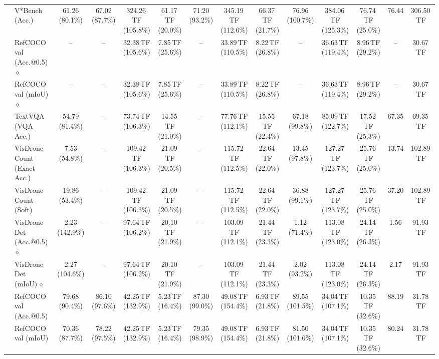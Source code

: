 \begin{table}[t]
\begin{center}
\begin{small}
\begin{sc}
{\begin{tabular}{llcccccccccccc}
& V*Bench (Acc.) & 61.26 (80.1\%) & 67.02 (87.7\%) & 324.26\,TF (105.8\%) & 61.17\,TF (20.0\%) & 71.20 (93.2\%) & 345.19\,TF (112.6\%) & 66.37\,TF (21.7\%) & 76.96 (100.7\%) & 384.06\,TF (125.3\%) & 76.74\,TF (25.0\%) & 76.44 & 306.50\,TF \\
& RefCOCO val (Acc.@0.5)\,$\diamond$ & -- & -- & 32.38\,TF (105.6\%) & 7.85\,TF (25.6\%) & -- & 33.89\,TF (110.5\%) & 8.22\,TF (26.8\%) & -- & 36.63\,TF (119.4\%) & 8.96\,TF (29.2\%) & -- & 30.67\,TF \\
& RefCOCO val (mIoU)\,$\diamond$ & -- & -- & 32.38\,TF (105.6\%) & 7.85\,TF (25.6\%) & -- & 33.89\,TF (110.5\%) & 8.22\,TF (26.8\%) & -- & 36.63\,TF (119.4\%) & 8.96\,TF (29.2\%) & -- & 30.67\,TF \\
& TextVQA (VQA Acc.) & 54.79 (81.4\%) & -- & 73.74\,TF (106.3\%) & 14.55\,TF (21.0\%) & -- & 77.76\,TF (112.1\%) & 15.55\,TF (22.4\%) & 67.18 (99.8\%) & 85.09\,TF (122.7\%) & 17.52\,TF (25.3\%) & 67.35 & 69.35\,TF \\
& VisDrone Count (Exact Acc.) & 7.53 (54.8\%) & -- & 109.42\,TF (106.3\%) & 21.09\,TF (20.5\%) & -- & 115.72\,TF (112.5\%) & 22.64\,TF (22.0\%) & 13.45 (97.8\%) & 127.27\,TF (123.7\%) & 25.76\,TF (25.0\%) & 13.74 & 102.89\,TF \\
& VisDrone Count (Soft) & 19.86 (53.4\%) & -- & 109.42\,TF (106.3\%) & 21.09\,TF (20.5\%) & -- & 115.72\,TF (112.5\%) & 22.64\,TF (22.0\%) & 36.88 (99.1\%) & 127.27\,TF (123.7\%) & 25.76\,TF (25.0\%) & 37.20 & 102.89\,TF \\
& VisDrone Det (Acc.@0.5)\,$\diamond$ & 2.23 (142.9\%) & -- & 97.64\,TF (106.2\%) & 20.10\,TF (21.9\%) & -- & 103.09\,TF (112.1\%) & 21.44\,TF (23.3\%) & 1.12 (71.4\%) & 113.08\,TF (123.0\%) & 24.14\,TF (26.3\%) & 1.56 & 91.93\,TF \\
& VisDrone Det (mIoU)\,$\diamond$ & 2.27 (104.6\%) & -- & 97.64\,TF (106.2\%) & 20.10\,TF (21.9\%) & -- & 103.09\,TF (112.1\%) & 21.44\,TF (23.3\%) & 2.02 (93.2\%) & 113.08\,TF (123.0\%) & 24.14\,TF (26.3\%) & 2.17 & 91.93\,TF \\
\midrule
{}
& RefCOCO val (Acc.@0.5) & 79.68 (90.4\%) & 86.10 (97.6\%) & 42.25\,TF (132.9\%) & 5.23\,TF (16.4\%) & 87.30 (99.0\%) & 49.08\,TF (154.4\%) & 6.93\,TF (21.8\%) & 89.55 (101.5\%) & 34.04\,TF (107.1\%) & 10.35\,TF (32.6\%) & 88.19 & 31.78\,TF \\
& RefCOCO val (mIoU) & 70.36 (87.7\%) & 78.22 (97.5\%) & 42.25\,TF (132.9\%) & 5.23\,TF (16.4\%) & 79.35 (98.9\%) & 49.08\,TF (154.4\%) & 6.93\,TF (21.8\%) & 81.50 (101.6\%) & 34.04\,TF (107.1\%) & 10.35\,TF (32.6\%) & 80.24 & 31.78\,TF \\

\end{tabular}}
\end{sc}
\end{small}
\end{center}
\end{table}
